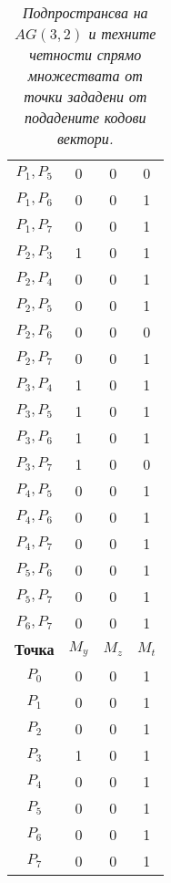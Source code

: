 \documentclass[11pt, oneside]{article}   	%
\begin{document}
\begin{table}
\begin{minipage}[t]{.3\textwidth}
\begin{tabular}{cccc}
$ P_{1}, P_{5} $ & 0 & 0 & 0 \\
$ P_{1}, P_{6} $ & 0 & 0 & 1 \\
$ P_{1}, P_{7} $ & 0 & 0 & 1 \\
$ P_{2}, P_{3} $ & 1 & 0 & 1 \\
$ P_{2}, P_{4} $ & 0 & 0 & 1 \\
$ P_{2}, P_{5} $ & 0 & 0 & 1 \\
$ P_{2}, P_{6} $ & 0 & 0 & 0 \\
$ P_{2}, P_{7} $ & 0 & 0 & 1 \\
$ P_{3}, P_{4} $ & 1 & 0 & 1 \\
$ P_{3}, P_{5} $ & 1 & 0 & 1 \\
$ P_{3}, P_{6} $ & 1 & 0 & 1 \\
$ P_{3}, P_{7} $ & 1 & 0 & 0 \\
$ P_{4}, P_{5} $ & 0 & 0 & 1 \\
$ P_{4}, P_{6} $ & 0 & 0 & 1 \\
$ P_{4}, P_{7} $ & 0 & 0 & 1 \\
$ P_{5}, P_{6} $ & 0 & 0 & 1 \\
$ P_{5}, P_{7} $ & 0 & 0 & 1 \\
$ P_{6}, P_{7} $ & 0 & 0 & 1 \\
\bottomrule
\toprule
\textbf{Точка} & \textbf{$M_{y}$} & \textbf{$M_{z}$} & \textbf{$M_{t}$}\\
\midrule
$ P_{0} $ & 0 & 0 & 1 \\
$ P_{1} $ & 0 & 0 & 1 \\
$ P_{2} $ & 0 & 0 & 1 \\
$ P_{3} $ & 1 & 0 & 1 \\
$ P_{4} $ & 0 & 0 & 1 \\
$ P_{5} $ & 0 & 0 & 1 \\
$ P_{6} $ & 0 & 0 & 1 \\
$ P_{7} $ & 0 & 0 & 1 \\
\bottomrule
\end{tabular}
\end{minipage} \hfill
\caption{\textit{Подпространсва на $AG(3, 2)$ и техните четности спрямо множествата от точки зададени от подадените кодови вектори.}}
\end{table}
\end{document}
